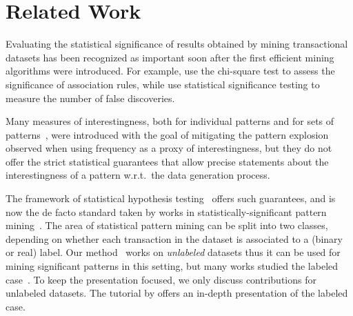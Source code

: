 \section{Related Work}\label{sec:related}

Evaluating the statistical significance of results obtained by mining
transactional datasets has been recognized as important soon after the first
efficient mining algorithms were introduced. For example, \citet{BrinMS97}
use the chi-square test to assess the significance of association rules, while
\citet{MegiddoS98} use statistical significance testing to measure the number of
false discoveries.

Many measures of interestingness, both for individual patterns and for sets of
patterns~\citep{KontonasiosSDB12,TanKS04,VreekenT14}, were introduced with the
goal of mitigating the pattern explosion observed when using frequency as a
proxy of interestingness, but they do not offer the strict statistical
guarantees that allow precise statements about the interestingness of a pattern
w.r.t.\ the data generation process.

The framework of statistical hypothesis testing~\citep[Ch.\ 10]{Wasserman05}
offers such guarantees, and is now the de facto standard taken by works in
statistically-significant pattern mining~\citep{HamalainenW19,PellegrinaRV19b}.
The area of statistical pattern mining can be split into two classes, depending
on whether each transaction in the dataset is associated to a (binary or real)
label. Our method \algo\ works on \emph{unlabeled} datasets thus it can be used
for mining significant patterns in this setting, but many works studied the
labeled
case~\citep{LlinaresLopezSPB15,MinatoUTTS14,PellegrinaV20,PellegrinaRV19a,TeradaOHTS13,WuHGLZY16,KomiyamaIANM17}.
To keep the presentation focused, we only discuss contributions for unlabeled
datasets. The tutorial by \citet{PellegrinaRV19b} offers an in-depth
presentation of the labeled case.

